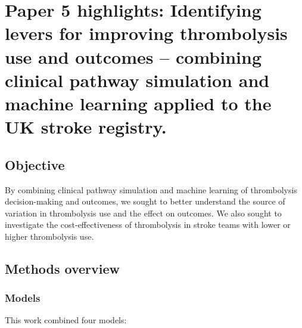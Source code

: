 \section{Paper 5 highlights: Identifying levers for improving thrombolysis use and outcomes – combining clinical pathway simulation and machine learning applied to the UK stroke registry.\cite{pearn_identifying_2024}} \label{sec:paper_5}

\subsection{Objective}

By combining clinical pathway simulation and machine learning of thrombolysis decision-making and outcomes, we sought to better understand the source of variation in thrombolysis use and the effect on outcomes. We also sought to investigate the cost-effectiveness of thrombolysis in stroke teams with lower or higher thrombolysis use.

\subsection{Methods overview}

\subsubsection{Models}

This work combined four models:

